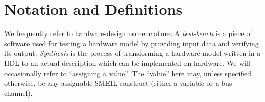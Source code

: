 \section{Notation and Definitions}
We frequently refer to hardware-design nomenclature: A {\itshape test-bench} is a
piece of software used for testing a hardware model by providing input data and
verifying its output. {\itshape Synthesis} is the process of transforming a
hardware-model written in a HDL to an actual description which can be
implemented on hardware. We will occasionally refer to ``assigning a
value''. The ``value'' here may, unless specified otherwise, be any assignable
SMEIL construct (either a variable or a bus channel).








